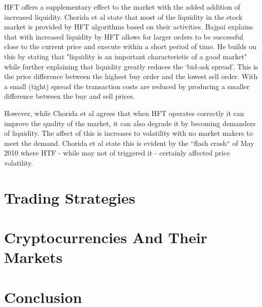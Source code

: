 \noindent HFT offers a supplementary effect to the market with the added addition of increased liquidity. Chorida et al \cite{REPORT:ChordiaEtAl:2013} state that most of the liquidity in the stock market is provided by HFT algorithms based on their activities. Bajpai \cite{WEB:Bajpai:0001} explains that with increased liquidity by HFT allows for larger orders to be successful close to the current price and execute within a short period of time. He builds on this by stating that "liquidity is an important characteristic of a good market" while further explaining that liquidity greatly reduces the `bid-ask spread'. This is the price difference between the highest buy order and the lowest sell order. With a small (tight) spread the transaction costs are reduced by producing a smaller difference between the buy and sell prices. 

However, while Chorida et al \cite{REPORT:ChordiaEtAl:2013} agrees that when HFT operates correctly it can improve the quality of the market, it can also degrade it by becoming demanders of liquidity. The affect of this is increases to volatility with no market makers to meet the demand. Chorida et al state this is evident by the ``flash crash`` of May 2010 where HTF - while may not of triggered it - certainly affected price volatility. 


\section{Trading Strategies}
\label{sec:related:tradingStrategies}


\section{Cryptocurrencies And Their Markets}
\label{sec:related:cryptoAndTheirMarkets}


\section{Conclusion}
\label{sec:related:conclusion}

